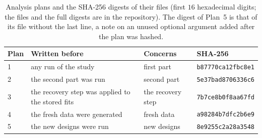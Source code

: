\begin{table}[htbp]
\centering
\footnotesize
\caption{Analysis plans and the SHA-256 digests of their files (first $16$ hexadecimal digits;
the files and the full digests are in the repository). The digest of Plan~5 is that of its file
without the last line, a note on an unused optional argument added after the plan was hashed.}
\label{tab:prereg}
\begin{tabular}{llll}
\toprule
Plan & Written before & Concerns & SHA-256 \\
\midrule
1 & any run of the study & first part & \texttt{b87770ca12fbc8e1} \\
2 & the second part was run & second part & \texttt{5e37bad8706336c6} \\
3 & the recovery step was applied to the stored fits & the recovery step & \texttt{7b7ce8b0f8aa67fd} \\
4 & the fresh data were generated & fresh data & \texttt{a98284b7dfc2b6e9} \\
5 & the new designs were run & new designs & \texttt{8e9255c2a28a3548} \\
\bottomrule
\end{tabular}
\end{table}
